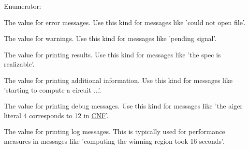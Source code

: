 \begin{Desc}
\item[Enumerator\-: ]\par
\begin{description}
\item[{\em 
\hypertarget{classLogger_ac9e601f90bf326ce2088de52018861dca482a49db2a0d40e2ae358619edb1633e}{E\-R\-R}\label{classLogger_ac9e601f90bf326ce2088de52018861dca482a49db2a0d40e2ae358619edb1633e}
}]The value for error messages. Use this kind for messages like 'could not open file'. \item[{\em 
\hypertarget{classLogger_ac9e601f90bf326ce2088de52018861dca90d291baa55088591aae64883cfc58bd}{W\-R\-N}\label{classLogger_ac9e601f90bf326ce2088de52018861dca90d291baa55088591aae64883cfc58bd}
}]The value for warnings. Use this kind for messages like 'pending signal'. \item[{\em 
\hypertarget{classLogger_ac9e601f90bf326ce2088de52018861dca97ed8522dfcbb2cdf29c7f46e583f42f}{R\-E\-S}\label{classLogger_ac9e601f90bf326ce2088de52018861dca97ed8522dfcbb2cdf29c7f46e583f42f}
}]The value for printing results. Use this kind for messages like 'the spec is realizable'. \item[{\em 
\hypertarget{classLogger_ac9e601f90bf326ce2088de52018861dca174739f9b95ebbf75fbb89001f72443b}{I\-N\-F}\label{classLogger_ac9e601f90bf326ce2088de52018861dca174739f9b95ebbf75fbb89001f72443b}
}]The value for printing additional information. Use this kind for messages like 'starting to compute a circuit ...'. \item[{\em 
\hypertarget{classLogger_ac9e601f90bf326ce2088de52018861dcaecb59ecf12f943da56b6944a3053dc09}{D\-B\-G}\label{classLogger_ac9e601f90bf326ce2088de52018861dcaecb59ecf12f943da56b6944a3053dc09}
}]The value for printing debug messages. Use this kind for messages like 'the aiger literal 4 corresponds to 12 in \hyperlink{classCNF}{C\-N\-F}'. \item[{\em 
\hypertarget{classLogger_ac9e601f90bf326ce2088de52018861dca07be7495a7931bee16f5d94b3671f5de}{L\-O\-G}\label{classLogger_ac9e601f90bf326ce2088de52018861dca07be7495a7931bee16f5d94b3671f5de}
}]The value for printing log messages. This is typically used for performance measures in messages like 'computing the winning region took 16 seconds'. \end{description}
\end{Desc}



